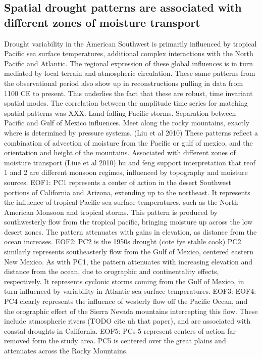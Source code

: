 \documentclass[11pt]{wlscirep}
\begin{document}
\subsection*{Spatial drought patterns are associated with different zones of moisture transport}
Drought variability in the American Southwest is primarily influenced by tropical Pacific sea surface temperatures, additional complex interactions with the North Pacific and Atlantic. The regional expression of these global influences is in turn mediated by local terrain and atmospheric circulation. These same patterns from the observational period also show up in reconstructions pulling in data from 1100 CE to present. This underlies the fact that these are robust, time invariant spatial modes. The correlation between the amplitude time series for matching spatial patterns was XXX. 
Land falling Pacific storms. Separation between Pacific and Gulf of Mexico influences. Meet along the rocky mountains, exactly where is determined by pressure systems. (Liu et al 2010)
These patterns reflect a combination of advection of moisture from the Pacific or gulf of mexico, and the orientation and height of the mountains.
Associated with different zones of moisture transport (Liue et al 2010)
hu and feng support interpretation that reof 1 and 2 are different monsoon regimes, influenced by topography and moisture sources.
EOF1:
PC1 represents a center of action in the desert Southwest portions of California and Arizona, extending up to the northeast. It represents the influence of tropical Pacific sea surface temperatures, such as the North American Monsoon and tropical storms. This pattern is produced by southwesterly flow from the tropical pacific, bringing moisture up across the low desert zones. The pattern attenuates with gains in elevation, as distance from the ocean increases.
EOF2: PC2 is the 1950s drought (cote fye stahle cook)
PC2 similarly represents southeasterly flow from the Gulf of Mexico, centered eastern New Mexico. As with PC1, the pattern attenuates with increasing elevation and distance from the ocean, due to orographic and continentality effects, respectively. It represents cyclonic storms coming from the Gulf of Mexico, in turn influenced by variability in Atlantic sea surface temperatures. 
EOF3:
EOF4:
PC4 clearly represents the influence of westerly flow off the Pacific Ocean, and the orographic effect of the Sierra Nevada mountains intercepting this flow. These include atmospheric rivers (TODO cite uh that paper), and are associated with coastal droughts in California.
EOF5:
 PCs 5 represent centers of action far removed form the study area. PC5 is centered over the great plains and attenuates across the Rocky Mountains.
\end{document}

